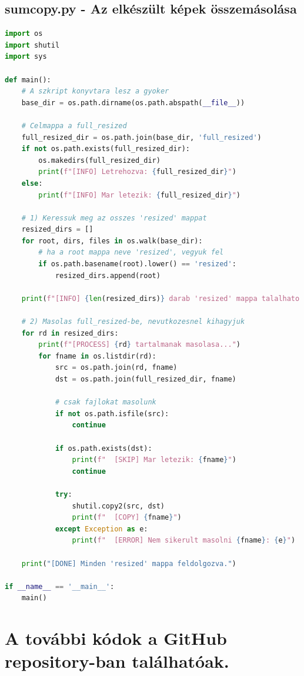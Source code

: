 \documentclass[	
  noindent
]{elteikthesis}[2024/04/26]
\begin{document}
  \subsection{sumcopy.py - Az elkészült képek összemásolása}
  \begin{lstlisting}[language={Python}]
import os
import shutil
import sys

def main():
    # A szkript konyvtara lesz a gyoker
    base_dir = os.path.dirname(os.path.abspath(__file__))
    
    # Celmappa a full_resized
    full_resized_dir = os.path.join(base_dir, 'full_resized')
    if not os.path.exists(full_resized_dir):
        os.makedirs(full_resized_dir)
        print(f"[INFO] Letrehozva: {full_resized_dir}")
    else:
        print(f"[INFO] Mar letezik: {full_resized_dir}")

    # 1) Keressuk meg az osszes 'resized' mappat
    resized_dirs = []
    for root, dirs, files in os.walk(base_dir):
        # ha a root mappa neve 'resized', vegyuk fel
        if os.path.basename(root).lower() == 'resized':
            resized_dirs.append(root)

    print(f"[INFO] {len(resized_dirs)} darab 'resized' mappa talalhato.")

    # 2) Masolas full_resized-be, nevutkozesnel kihagyjuk
    for rd in resized_dirs:
        print(f"[PROCESS] {rd} tartalmanak masolasa...")
        for fname in os.listdir(rd):
            src = os.path.join(rd, fname)
            dst = os.path.join(full_resized_dir, fname)

            # csak fajlokat masolunk
            if not os.path.isfile(src):
                continue

            if os.path.exists(dst):
                print(f"  [SKIP] Mar letezik: {fname}")
                continue

            try:
                shutil.copy2(src, dst)
                print(f"  [COPY] {fname}")
            except Exception as e:
                print(f"  [ERROR] Nem sikerult masolni {fname}: {e}")

    print("[DONE] Minden 'resized' mappa feldolgozva.")

if __name__ == '__main__':
    main()
  \end{lstlisting}

  \section{A további kódok a GitHub repository-ban találhatóak.}


\listoffigures
\listoftables
\end{document}
